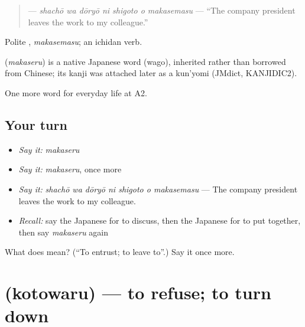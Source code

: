 \begin{quote}
\textbf{   } — \emph{shachō wa dōryō ni shigoto o makasemasu} — \textquotedblleft{}The company president leaves the work to my colleague.\textquotedblright{}
\end{quote}

Polite \textbf{}, \emph{makasemasu}; an ichidan verb.

\begin{cousinweb}
\textbf{} (\emph{makaseru}) is a native Japanese word (wago), inherited rather than borrowed from Chinese; its kanji was attached later as a kun'yomi (JMdict, KANJIDIC2).
\end{cousinweb}

\begin{grammarlens}[title={What you've built}]
One more word for everyday life at A2.
\end{grammarlens}

\subsection*{Your turn}
\begin{itemize}
\raggedright
  \item \emph{Say it:} \emph{makaseru}
  \item \emph{Say it:} \emph{makaseru}, once more
  \item \emph{Say it:} \emph{shachō wa dōryō ni shigoto o makasemasu} — The company president leaves the work to my colleague.
  \item \emph{Recall:} say the Japanese for to discuss, then the Japanese for to put together, then say \emph{makaseru} again
\end{itemize}

\begin{tcolorbox}[breakable,colback=teal!4,colframe=teal!35!black,title={Before you move on}]
What does  mean? (\textquotedblleft{}To entrust; to leave to\textquotedblright{}.) Say it once more.
\end{tcolorbox}
\section[\texorpdfstring{\ja{ことわる} (kotowaru)}{ことわる (kotowaru)}]{ (kotowaru) — to refuse; to turn down}

\label{lesson:JA-C232-kotowaru}



